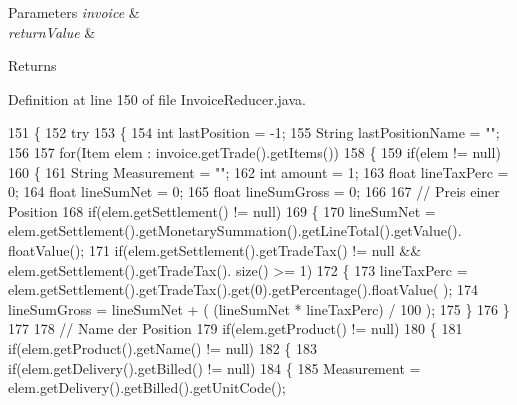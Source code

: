 \begin{DoxyParams}{Parameters}
{\em invoice} & \\
\hline
{\em return\+Value} & \\
\hline
\end{DoxyParams}
\begin{DoxyReturn}{Returns}

\end{DoxyReturn}


Definition at line 150 of file Invoice\+Reducer.\+java.


\begin{DoxyCode}
151     \{
152         \textcolor{keywordflow}{try}
153         \{
154         \textcolor{keywordtype}{int} lastPosition = -1;
155         String lastPositionName = \textcolor{stringliteral}{""};
156         
157         \textcolor{keywordflow}{for}(Item elem : invoice.getTrade().getItems())
158         \{
159             \textcolor{keywordflow}{if}(elem != null)
160             \{
161                 String Measurement = \textcolor{stringliteral}{""};
162                 \textcolor{keywordtype}{int} amount = 1;
163                 \textcolor{keywordtype}{float} lineTaxPerc = 0;
164                 \textcolor{keywordtype}{float} lineSumNet = 0;
165                 \textcolor{keywordtype}{float} lineSumGross = 0;
166                 
167                 \textcolor{comment}{// Preis einer Position}
168                 \textcolor{keywordflow}{if}(elem.getSettlement() != null)
169                 \{
170                     lineSumNet = elem.getSettlement().getMonetarySummation().getLineTotal().getValue().
      floatValue();
171                     \textcolor{keywordflow}{if}(elem.getSettlement().getTradeTax() != null  && elem.getSettlement().getTradeTax().
      size() >= 1)
172                     \{
173                         lineTaxPerc = elem.getSettlement().getTradeTax().get(0).getPercentage().floatValue(
      );
174                         lineSumGross = lineSumNet + ( (lineSumNet * lineTaxPerc) / 100 );
175                     \}
176                 \}
177                 
178                 \textcolor{comment}{// Name der Position}
179                 \textcolor{keywordflow}{if}(elem.getProduct() != null)
180                 \{
181                     \textcolor{keywordflow}{if}(elem.getProduct().getName() != null)
182                     \{
183                         \textcolor{keywordflow}{if}(elem.getDelivery().getBilled() != null)
184                         \{
185                             Measurement = elem.getDelivery().getBilled().getUnitCode();

\end{DoxyCode}
